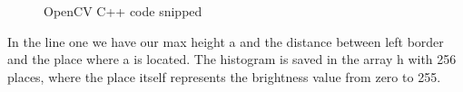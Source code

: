 \begin{figure}[ht]
	\centering
	
	\caption{OpenCV C++ code snipped}
	\label{theory:code}
\end{figure}
In the line one we have our max height a and the distance between left border and the place where a is located. The histogram is saved in the array h with 256 places, where the place itself represents the brightness value from zero to 255.
\newpage